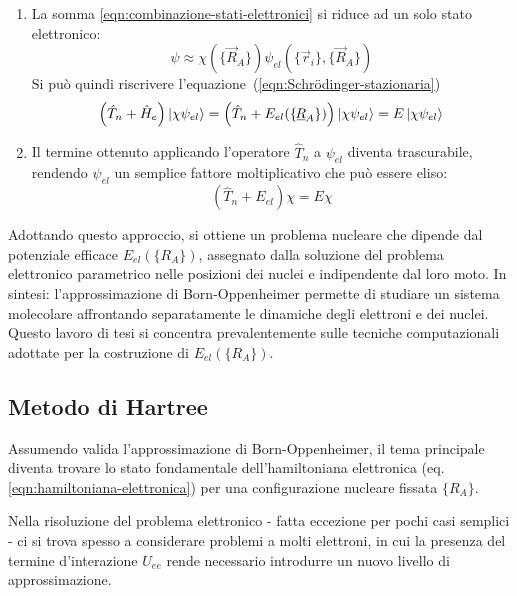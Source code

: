 \begin{enumerate}
    \item La somma \ref{eqn:combinazione-stati-elettronici} si riduce ad un solo stato elettronico:
        \begin{equation}\label{eqn:approssimazione-adiabatica}
            \psi \approx \chi(\{\vec{R}_A\}) \psi_{el}(\{\vec{r}_i\},\{\vec{R}_A\})
        \end{equation}
        Si può quindi riscrivere l'equazione~(\ref{eqn:Schrödinger-stazionaria})
        \begin{equation}
            \left(\hat{T}_n+\hat{H}_e\right)\ket{\chi\psi_{el}} =
            \left(\hat{T}_n+E_{el}(\{\underline{\hspace{-0.1em}R\hspace{-0.05em}}_A\})\right)\ket{\chi\psi_{el}} = E\ket{\chi\psi_{el}}
        \end{equation}

    \item Il termine ottenuto applicando l'operatore $\hat{T}_n$ a $\psi_{el}$ diventa trascurabile, rendendo $\psi_{el}$ un semplice fattore moltiplicativo che può essere eliso:
        \begin{equation}
            (\hat{T}_n+E_{el})\chi = E\chi
        \end{equation}
\end{enumerate}

Adottando questo approccio, si ottiene un problema nucleare che dipende dal potenziale efficace $E_{el}(\{R_A\})$, assegnato dalla soluzione del problema elettronico parametrico nelle posizioni dei nuclei e indipendente dal loro moto. 
In sintesi: l'approssimazione di Born-Oppenheimer permette di studiare un sistema molecolare affrontando separatamente le dinamiche degli elettroni e dei nuclei. Questo lavoro di tesi si concentra prevalentemente sulle tecniche computazionali adottate per la costruzione di $E_{el}(\{R_A\})$.

\subsection{Metodo di Hartree}\label{subsec:Hartree}

Assumendo valida l’approssimazione di Born-Oppenheimer, il tema principale diventa trovare lo stato fondamentale dell’hamiltoniana elettronica (eq. \ref{eqn:hamiltoniana-elettronica}) per una configurazione nucleare fissata $\{R_A\}$.

Nella risoluzione del problema elettronico - fatta eccezione per pochi casi semplici - ci si trova spesso a considerare problemi a molti elettroni, in cui la presenza del termine d'interazione $U_{ee}$ rende necessario introdurre un nuovo livello di approssimazione.


